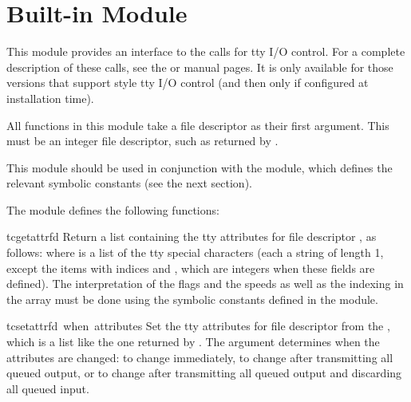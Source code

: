 \section{Built-in Module }
\label{module-termios}


This module provides an interface to the \POSIX{} calls for tty I/O
control.  For a complete description of these calls, see the \POSIX{} or
\UNIX{} manual pages.  It is only available for those \UNIX{} versions
that support \POSIX{}  style tty I/O control (and then
only if configured at installation time).

All functions in this module take a file descriptor  as their
first argument.  This must be an integer file descriptor, such as
returned by .

This module should be used in conjunction with the 
module, which defines the relevant symbolic constants (see the next
section).

The module defines the following functions:

\begin{funcdesc}{tcgetattr}{fd}
Return a list containing the tty attributes for file descriptor
, as follows:  where  is
a list of the tty special characters (each a string of length 1,
except the items with indices  and , which are
integers when these fields are defined).  The interpretation of the
flags and the speeds as well as the indexing in the  array
must be done using the symbolic constants defined in the
 module.
\end{funcdesc}

\begin{funcdesc}{tcsetattr}{fd\, when\, attributes}
Set the tty attributes for file descriptor  from the
, which is a list like the one returned by
.  The  argument determines when the
attributes are changed:  to change immediately,
 to change after transmitting all queued
output, or  to change after transmitting all
queued output and discarding all queued input.
\end{funcdesc}


